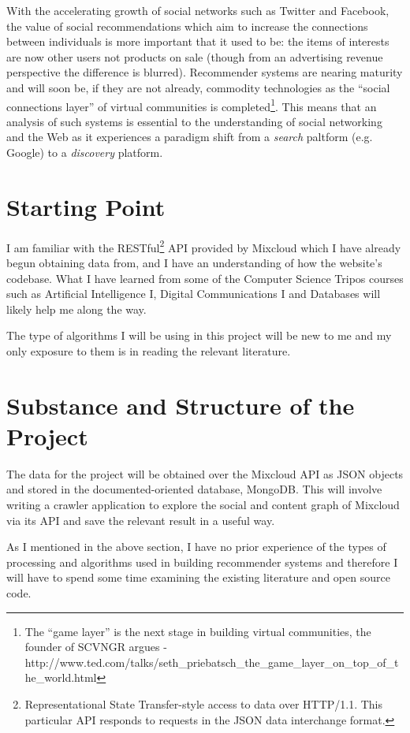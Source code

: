 With the accelerating growth of social networks such as Twitter and Facebook, the value of social recommendations which aim to increase the connections between individuals is more important that it used to be: the items of interests are now other users not products on sale (though from an advertising revenue perspective the difference is blurred). Recommender systems are nearing maturity and will soon be, if they are not already, commodity technologies as the ``social connections layer'' of virtual communities is completed\footnote{The ``game layer'' is the next stage in building virtual communities, the founder of SCVNGR argues - http://www.ted.com/talks/seth\_priebatsch\_the\_game\_layer\_on\_top\_of\_the\_world.html}. This means that an analysis of such systems is essential to the understanding of social networking and the Web as it experiences a paradigm shift from a \emph{search} paltform (e.g. Google) to a \emph{discovery} platform.

\section{Starting Point}

I am familiar with the RESTful\footnote{Representational State Transfer-style access to data over HTTP/1.1. This particular API responds to requests in the JSON data interchange format.} API provided by Mixcloud which I have already begun obtaining data from, and I have an understanding of how the website's codebase. What I have learned from some of the Computer Science Tripos courses such as Artificial Intelligence I, Digital Communications I and Databases will likely help me along the way.

The type of algorithms I will be using in this project will be new to me and my only exposure to them is in reading the relevant literature.
  
\section{Substance and Structure of the Project}

The data for the project will be obtained over the Mixcloud API as JSON objects and stored in the documented-oriented database, MongoDB. This will involve writing a crawler application to explore the social and content graph of Mixcloud via its API and save the relevant result in a useful way.

As I mentioned in the above section, I have no prior experience of the types of processing and algorithms used in building recommender systems and therefore I will have to spend some time examining the existing literature and open source code.

